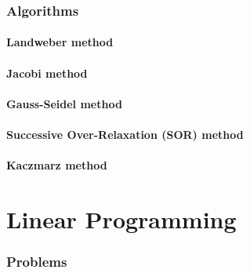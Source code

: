 \documentclass[a4paper]{article}
\newcommand{\labbase}{}
\let\OrigLstInputListing
\renewcommand{}[2][]{\OrigLstInputListing[#1]{\labbase#2}}
\begin{document}
\section{Algorithms}
\subsection{Landweber method}%
\label{alg:landweber}


\subsection{Jacobi method}%
\label{alg:jacobi}


\subsection{Gauss-Seidel method}%
\label{alg:gauss-seidel}


\subsection{Successive Over-Relaxation (SOR) method}%
\label{alg:sor}


\subsection{Kaczmarz method}%
\label{alg:kaczmarz}


\part{Linear Programming}

\renewcommand{\labbase}{lab6/}

\section{Problems}



\clearpage
\end{document}
